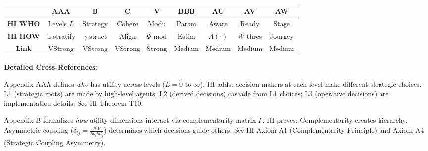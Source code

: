 
\begin{tcolorbox}[colback=white, colframe=black,
    title=\textbf{9C Integration: How HI CORE-HIERARCHY Connects to Other COREs}]

\begin{center}
\small
\begin{tabular}{@{}c|cccccccc@{}}
\toprule
& \textbf{AAA} & \textbf{B} & \textbf{C} & \textbf{V} & \textbf{BBB} & \textbf{AU} & \textbf{AV} & \textbf{AW} \\
\midrule
\textbf{HI \textbf{WHO}} & Levels $L$ & Strategy & Cohere & Modu & Param & Aware & Ready & Stage \\
\textbf{HI \textbf{HOW}} & L-stratify & $\gamma$ struct & Align & $\Psi$ mod & Estim & $A(\cdot)$ & $W$ thres & Journey \\
\midrule
\textbf{Link} & \cellcolor{red!20}VStrong & \cellcolor{red!20}VStrong & \cellcolor{red!20}VStrong & \cellcolor{red!20}Strong & \cellcolor{yellow!20}Medium & \cellcolor{yellow!20}Medium & \cellcolor{yellow!20}Medium & \cellcolor{yellow!20}Medium \\
\bottomrule
\end{tabular}
\end{center}

\textbf{Detailed Cross-References:}

\begin{description}[style=nextline, labelindent=0pt, leftmargin=1.5cm]

\item[\textbf{AAA (CORE-WHO)}]
Appendix AAA defines \textit{who} has utility across levels ($L=0$ to $\infty$). HI adds: decision-makers at each level make different strategic choices. L1 (strategic roots) are made by high-level agents; L2 (derived decisions) cascade from L1 choices; L3 (operative decisions) are implementation details. See HI Theorem T10.

\item[\textbf{B (CORE-HOW)}]
Appendix B formalizes \textit{how} utility dimensions interact via complementarity matrix $\Gamma$. HI proves: Complementarity creates hierarchy. Asymmetric coupling ($\delta_{ij} = \frac{\partial^2 V}{\partial d_i \partial d_j}$) determines which decisions guide others. See HI Axiom A1 (Complementarity Principle) and Axiom A4 (Strategic Coupling Asymmetry).


\end{description}
\end{tcolorbox}
